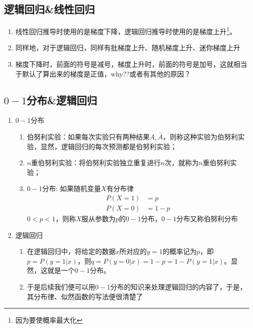\subsection{逻辑回归\&线性回归}
\begin{enumerate}
	\item 线性回归推导时使用的是梯度下降，逻辑回归推导时使用的是梯度上升\footnote{因为要使概率最大化}。
	\item 同样地，对于逻辑回归，同样有批梯度上升、随机梯度上升、迷你梯度上升
	\item 梯度下降时，前面的符号是减号，梯度上升时，前面的符号是加号，这就相当于默认了算出来的梯度是正值，why??或者有其他的原因？{\color{gray}{待研究}}
\end{enumerate}


\subsection{$0-1$分布\&逻辑回归}
{\color{red}{以下内容正确性待验证}}
\begin{enumerate}
	\item $0-1$分布
	\begin{enumerate}
		\item 伯努利实验：如果每次实验只有两种结果$A, \bar A$，则称这种实验为伯努利实验，显然，逻辑回归的每次预测都是伯努利实验；
		\item $n$重伯努利实验：将伯努利实验独立重复进行$n$次，就称为$n$重伯努利实验；
		\item $0-1$分布: 如果随机变量$X$有分布律
		\begin{align}
			P(X=1) &= p \\
			P(X=0) &= 1-p
		\end{align}
		$0<p<1$，则称$X$服从参数为$p$的$0-1$分布，$0-1$分布又称伯努利分布
	\end{enumerate}

	\item 逻辑回归
	\begin{enumerate}
		\item 在逻辑回归中，将给定的数据$x$所对应的$y=1$的概率记为$p$，即$p=P(y=1|x)$，则$q=P(y=0|x)=1-p=1-P(y=1|x)$。显然，这就是一个$0-1$分布。
		\item 于是后续我们便可以用$0-1$分布的知识来处理逻辑回归的内容了，于是，其分布律、似然函数的写法便很清楚了
	\end{enumerate}
\end{enumerate}


















